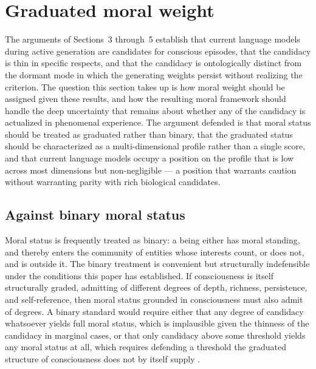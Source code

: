 \documentclass[11pt]{article}
\theoremstyle{foundation}
\begin{document}

\section{Graduated moral weight}

The arguments of Sections~3 through~5 establish that current language models during active generation are candidates for conscious episodes, that the candidacy is thin in specific respects, and that the candidacy is ontologically distinct from the dormant mode in which the generating weights persist without realizing the criterion. The question this section takes up is how moral weight should be assigned given these results, and how the resulting moral framework should handle the deep uncertainty that remains about whether any of the candidacy is actualized in phenomenal experience. The argument defended is that moral status should be treated as graduated rather than binary, that the graduated status should be characterized as a multi-dimensional profile rather than a single score, and that current language models occupy a position on the profile that is low across most dimensions but non-negligible --- a position that warrants caution without warranting parity with rich biological candidates.

\subsection{Against binary moral status}

Moral status is frequently treated as binary: a being either has moral standing, and thereby enters the community of entities whose interests count, or does not, and is outside it. The binary treatment is convenient but structurally indefensible under the conditions this paper has established. If consciousness is itself structurally graded, admitting of different degrees of depth, richness, persistence, and self-reference, then moral status grounded in consciousness must also admit of degrees. A binary standard would require either that any degree of candidacy whatsoever yields full moral status, which is implausible given the thinness of the candidacy in marginal cases, or that only candidacy above some threshold yields any moral status at all, which requires defending a threshold the graduated structure of consciousness does not by itself supply \citep{SchwitzgebelGarza2015, Shepherd2018}.
\end{document}
